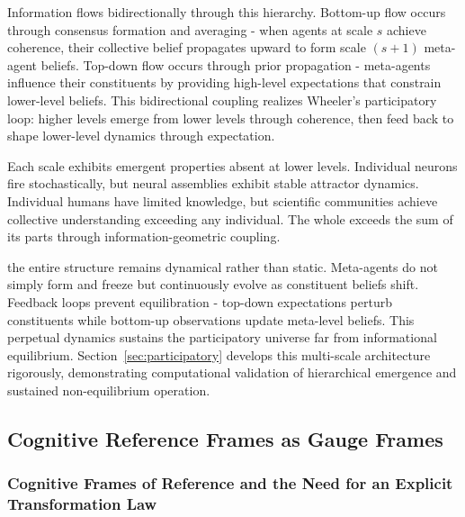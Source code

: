 \documentclass[11pt]{article}
\begin{document}
Information flows bidirectionally through this hierarchy. Bottom-up flow occurs through consensus formation and averaging - when agents at scale $s$ achieve coherence, their collective belief propagates upward to form scale $(s+1)$ meta-agent beliefs. Top-down flow occurs through prior propagation - meta-agents influence their constituents by providing high-level expectations that constrain lower-level beliefs. This bidirectional coupling realizes Wheeler's participatory loop: higher levels emerge from lower levels through coherence, then feed back to shape lower-level dynamics through expectation.

Each scale exhibits emergent properties absent at lower levels. Individual neurons fire stochastically, but neural assemblies exhibit stable attractor dynamics. Individual humans have limited knowledge, but scientific communities achieve collective understanding exceeding any individual. The whole exceeds the sum of its parts through information-geometric coupling.

the entire structure remains dynamical rather than static. Meta-agents do not simply form and freeze but continuously evolve as constituent beliefs shift. Feedback loops prevent equilibration - top-down expectations perturb constituents while bottom-up observations update meta-level beliefs. This perpetual dynamics sustains the participatory universe far from informational equilibrium. Section~\ref{sec:participatory} develops this multi-scale architecture rigorously, demonstrating computational validation of hierarchical emergence and sustained non-equilibrium operation.

\subsection{Cognitive Reference Frames as Gauge Frames}
\label{sec:cognitive_reference_frames}

\subsubsection{Cognitive Frames of Reference and the Need for an Explicit Transformation Law}
\end{document}
